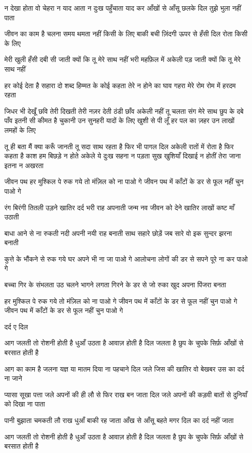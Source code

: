 न देखा होता वो चेहरा न
याद आता न दुःख पहुँचाता
याद कर आँखों से आँसू छलके
दिल तुझे भुला नहीं पाता


जीवन का काम है चलना
समय थमता नहीं किसी के लिए
बाकी बची ज़िंदगी ऊपर से हँसी
दिल रोता किसी के लिए

मेरी खुली हँसी दबी सी जाती
क्यों कि तू मेरे साथ नहीं
भरी महफ़िल में अकेली पड़ जाती
क्यों कि तू मेरे साथ नहीं


हर कोई देता है सहारा
दो शब्द हिम्मत के कोई कहता
तेरे न होने का घाव गहरा
मेरे रोम रोम में हरदम रहता

जिधर भी देखूँ छवि तेरी दिखती
तेरी नज़र देती ठंडी छाँव
अकेली नहीं तू चलता संग
मेरे साथ छुप के दबे पाँव
इतनी सी कीमत है चुकानी
उन सुनहरी यादों के लिए
खुशी से पी लूँ हर पल का ज़हर
उन लाखों लमहों के लिए

तू ही बता मैं क्या करूँ
जानती तू सदा साथ रहता है
फिर भी पागल दिल अकेली
रातों में रोता है फिर कहता है
काश हम बिछड़े न होते
अकेले ये दुःख सहना न पड़ता
सुख खुशियाँ दिखाई न होतीं
तेरा जाना इतना न अखरता


जीवन पथ
हर मुश्किल पे रुक गये तो
मंज़िल को ना पाओ गे
जीवन पथ में काँटों के डर से
फूल नहीं चुन पाओ गे

रंग बिरंगी तितली उड़ने खातिर
दर्द भरी राह अपनाती
जन्म नव जीवन को देने खातिर
लाखों कष्ट माँ उठाती

बाधा आने से ना रुकती नदी
अपनी नयी राह बनाती
साथ सहारे छोड़ें जब सारे
वो इक सुन्दर झरना बनाती


कुत्ते के भौंकने से रुक गये
घर अपने भी ना जा पाओ गे
आलोचना लोगों की डर से
सपने पूरे ना कर पाओ गे

बच्चा गिर के संभलता
उठ चलने भागने लगता
गिरने के डर से जो रुका
खुद अपना पिंजरा बनता


हर मुश्किल पे रुक गये तो
मंज़िल को ना पाओ गे
जीवन पथ में काँटों के डर से
फूल नहीं चुन पाओ गे
जीवन पथ में काँटों के डर से
फूल नहीं चुन पाओ गे


दर्द ए दिल

आग जलती तो रोशनी होती है
धुआँ उठता है आवाज़ होती है
दिल जलता है छुप के चुपके
सिर्फ़ आँखों से बरसात होती है

आग का काम है जलना
यज्ञ या मातम दिया ना पहचाने
दिल जले जिस की खातिर
वो बेखबर उस का दर्द ना जाने


प्यासा सूखा पत्ता जले
अपनों की ही लौ से
फिर राख बन जाता
दिल जले अपनों की
कड़वी बातों से
दुनियाँ को दिखा ना पाता

पानी बुझाता चमकती लौ
राख धुआँ बाकी रह जाता
आँख से आँसू बहते मगर
दिल का दर्द नहीं जाता

आग जलती तो रोशनी होती है
धुआँ उठता है आवाज़ होती है
दिल जलता है छुप के चुपके
सिर्फ़ आँखों से बरसात होती है





